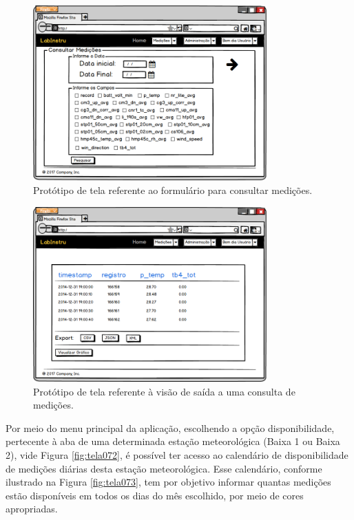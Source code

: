 \begin{figure}[H]
	\centering
	\includegraphics[width=0.8\textwidth]{./img/telas/tela058.png}
	\caption{Protótipo de tela referente ao formulário para consultar medições.} \label{fig:tela058}
\end{figure}

\begin{figure}[H]
	\centering
	\includegraphics[width=0.8\textwidth]{./img/telas/tela062.png}
	\caption{Protótipo de tela referente à visão de saída a uma consulta de medições.} \label{fig:tela062}
\end{figure}

Por meio do menu principal da aplicação, escolhendo a opção disponibilidade, pertecente à aba de uma determinada estação meteorológica (Baixa 1 ou Baixa 2), vide Figura \ref{fig:tela072}, é possível ter acesso ao calendário de disponibilidade de medições diárias desta estação meteorológica. Esse calendário, conforme ilustrado na Figura \ref{fig:tela073}, tem por objetivo informar quantas medições estão disponíveis em todos os dias do mês escolhido, por meio de cores apropriadas.

